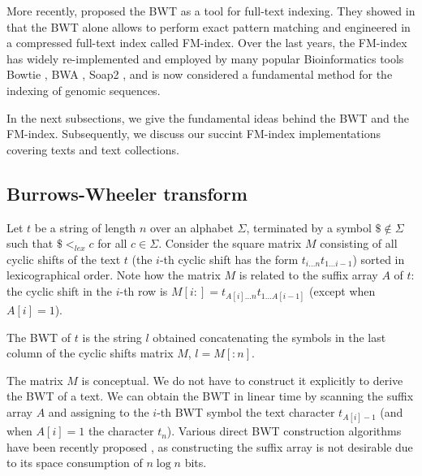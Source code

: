 More recently, \citeauthor{Ferragina2000} proposed the BWT as a tool for full-text indexing.
They showed in \citep{Ferragina2000} that the BWT alone allows to perform exact pattern matching and engineered in \citep{Ferragina2001} a compressed full-text index called FM-index.
Over the last years, the FM-index has widely re-implemented and employed by many popular Bioinformatics tools \eg Bowtie \citep{Bowtie}, BWA \citep{BWA}, Soap2 \citep{Soap2}, and is now considered a fundamental method for the indexing of genomic sequences.

In the next subsections, we give the fundamental ideas behind the BWT and the FM-index.
Subsequently, we discuss our succint FM-index implementations covering texts and text collections.

\subsection{Burrows-Wheeler transform}

Let $t$ be a string of length $n$ over an alphabet $\Sigma$, terminated by a symbol $\$ \notin \Sigma$ such that $\$ <_{lex} c$ for all $c \in \Sigma$.
Consider the square matrix $M$ consisting of all cyclic shifts of the text $t$ (the $i$-th cyclic shift has the form $t_{i \dots n} t_{1 \dots i-1}$) sorted in lexicographical order.
Note how the matrix $M$ is related to the suffix array $A$ of $t$: the cyclic shift in the $i$-th row is $M[i:] = t_{A[i] \dots n} t_{1 \dots A[i-1]}$ (except when $A[i] = 1$).

\begin{definition}
The BWT of $t$ is the string $l$ obtained concatenating the symbols in the last column of the cyclic shifts matrix $M$, \ie $l = M[:n]$.
\end{definition}


The matrix $M$ is conceptual. We do not have to construct it explicitly to derive the BWT of a text.
We can obtain the BWT in linear time by scanning the suffix array $A$ and assigning to the $i$-th BWT symbol the text character $t_{A[i]-1}$ (and when $A[i]=1$ the character $t_n$).
Various direct BWT construction algorithms have been recently proposed \citep{Bauer2013, Crochemore2013}, as constructing the suffix array is not desirable due to its space consumption of $n \log{n}$ bits.

